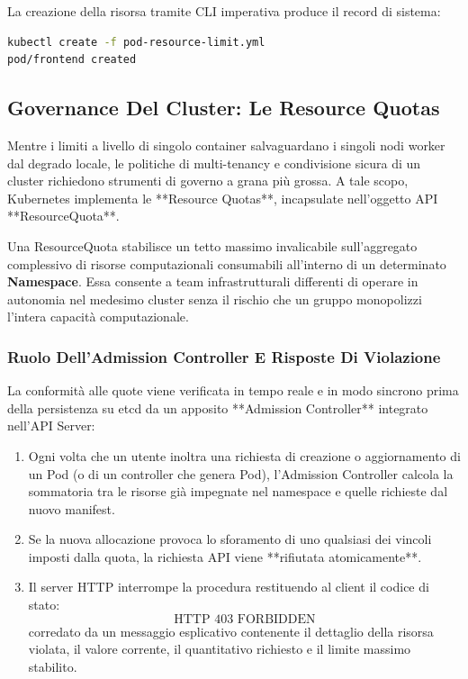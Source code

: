 \documentclass[11pt, a4paper]{article}
\begin{document}
La creazione della risorsa tramite CLI imperativa produce il record di sistema:
\begin{lstlisting}[language=bash]
kubectl create -f pod-resource-limit.yml
pod/frontend created
\end{lstlisting}

\subsection{Governance Del Cluster: Le Resource Quotas}

Mentre i limiti a livello di singolo container salvaguardano i singoli nodi worker dal degrado locale, le politiche di multi-tenancy e condivisione sicura di un cluster richiedono strumenti di governo a grana più grossa. A tale scopo, Kubernetes implementa le **Resource Quotas**, incapsulate nell'oggetto API **ResourceQuota**.

Una ResourceQuota stabilisce un tetto massimo invalicabile sull'aggregato complessivo di risorse computazionali consumabili all'interno di un determinato \textbf{Namespace}. Essa consente a team infrastrutturali differenti di operare in autonomia nel medesimo cluster senza il rischio che un gruppo monopolizzi l'intera capacità computazionale.

\subsubsection{Ruolo Dell'Admission Controller E Risposte Di Violazione}
La conformità alle quote viene verificata in tempo reale e in modo sincrono prima della persistenza su etcd da un apposito **Admission Controller** integrato nell'API Server:
\begin{enumerate}[noitemsep]
    \item Ogni volta che un utente inoltra una richiesta di creazione o aggiornamento di un Pod (o di un controller che genera Pod), l'Admission Controller calcola la sommatoria tra le risorse già impegnate nel namespace e quelle richieste dal nuovo manifest.
    \item Se la nuova allocazione provoca lo sforamento di uno qualsiasi dei vincoli imposti dalla quota, la richiesta API viene **rifiutata atomicamente**.
    \item Il server HTTP interrompe la procedura restituendo al client il codice di stato:
    \[
    \boxed{\text{HTTP 403 FORBIDDEN}}
    \]
    corredato da un messaggio esplicativo contenente il dettaglio della risorsa violata, il valore corrente, il quantitativo richiesto e il limite massimo stabilito.
\end{enumerate}
\end{document}
